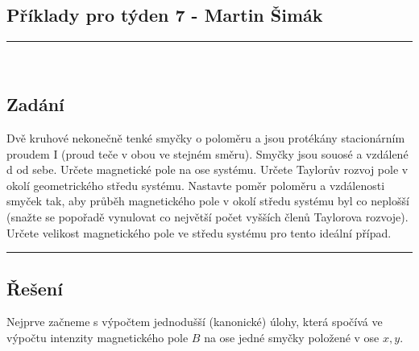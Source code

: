 \documentclass[12pt,a4paper]{report}
\begin{document}
	
	\begin{center}
		\section*{Příklady pro týden 7 - Martin Šimák}
		\noindent\rule{13cm}{1.6pt} \\[5mm]
	\end{center}
	
	\subsection*{Zadání}
		Dvě kruhové nekonečně tenké smyčky o poloměru a jsou protékány stacionárním proudem I (proud teče v obou ve stejném směru). Smyčky jsou souosé a vzdálené d od sebe. Určete magnetické pole na ose systému. Určete Taylorův rozvoj pole v okolí geometrického středu systému. Nastavte poměr poloměru a vzdálenosti smyček tak, aby průběh magnetického pole v okolí středu systému byl co neplošší (snažte se   popořadě   vynulovat   co   největší   počet   vyšších   členů   Taylorova   rozvoje).   Určete   velikost magnetického pole ve středu systému pro tento ideální případ. \\
	\noindent\rule{8cm}{0.4pt}
	
	\subsection*{Řešení}
		Nejprve začneme s výpočtem jednodušší (kanonické)  úlohy, která spočívá ve výpočtu intenzity magnetického pole $B$ na ose jedné smyčky položené v ose $x,y$.
		
\end{document}
